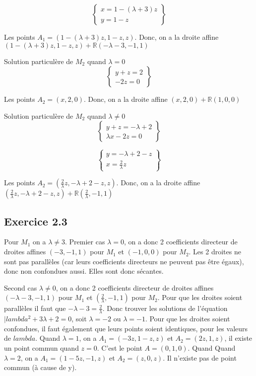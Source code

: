 \documentclass[]{book}
\theoremstyle{definition}
\newcommand{\bb}[1]{\mathbb{#1}}
\newcommand{\R}{\bb{R}}
\begin{document}
$$
\left\{ 
    \begin{array}{l}
        x  = 1 - (\lambda + 3) z\\
         y = 1-z
    \end{array}
\right\}
$$

Les points $A_1 = (1 - (\lambda + 3) z, 1-z, z)$. Donc, on a la droite affine $(1 - (\lambda + 3) z, 1-z, z) + \R(-\lambda -3, -1, 1)$

Solution particul\`ere de $M_2$ quand $\lambda = 0$
$$
\left\{ 
    \begin{array}{l}
        y+z  = 2\\
        -2z = 0
    \end{array}
\right\}
$$

Les points $A_2 = (x,2,0)$. Donc, on a la droite affine $(x,2,0) + \R(1,0,0)$


Solution particul\`ere de $M_2$ quand $\lambda \neq 0$
$$
\left\{ 
    \begin{array}{l}
        y+z  = -\lambda + 2\\
        \lambda x -2z = 0
    \end{array}
\right\}
$$

$$
\left\{ 
    \begin{array}{l}
        y = -\lambda + 2 - z\\
        x = \frac{2}{\lambda}z
    \end{array}
\right\}
$$

Les points $A_2 = (\frac{2}{\lambda}z,-\lambda + 2 - z,z)$. Donc, on a la droite affine $(\frac{2}{\lambda}z,-\lambda + 2 - z,z) + \R(\frac{2}{\lambda},-1,1)$


\subsection*{Exercice 2.3}
Pour $M_1$ on a $\lambda \neq 3$. Premier cas $\lambda = 0$, on a donc 2 coefficients directeur de droites affines $(-3, -1, 1)$ pour $M_1$ et $(-1, 0, 0)$ pour $M_2$. Les 2 droites ne sont pas parall\`eles (car leurs coefficients directeurs ne peuvent pas \^etre \'egaux), donc non confondues aussi. Elles sont donc s\'ecantes.

Second cas $\lambda \neq 0$, on a donc 2 coefficients directeur de droites affines $(-\lambda -3, -1, 1)$ pour $M_1$ et $(\frac{2}{\lambda}, -1, 1)$ pour $M_2$. Pour que les droites soient parall\`eles il faut que $-\lambda -3 = \frac{2}{\lambda}$. Donc trouver les solutions de l'\'equation $|lambda^2 + 3\lambda + 2 = 0$, soit $\lambda = -2$ ou $\lambda = -1$. Pour que les droites soient confondues, il faut \'egalement que leurs points soient identiques, pour les valeurs de $lambda$. Quand $\lambda = 1$, on a $A_1 = (-3z,1-z,z)$ et $A_2 = (2z,1,z)$, il existe un point commun quand $z=0$. C'est le point $A=(0,1,0)$. Quand Quand $\lambda = 2$, on a $A_1 = (1-5z,-1,z)$ et $A_2 = (z,0,z)$. Il n'existe pas de point commun (\`a cause de y).
\end{document}
